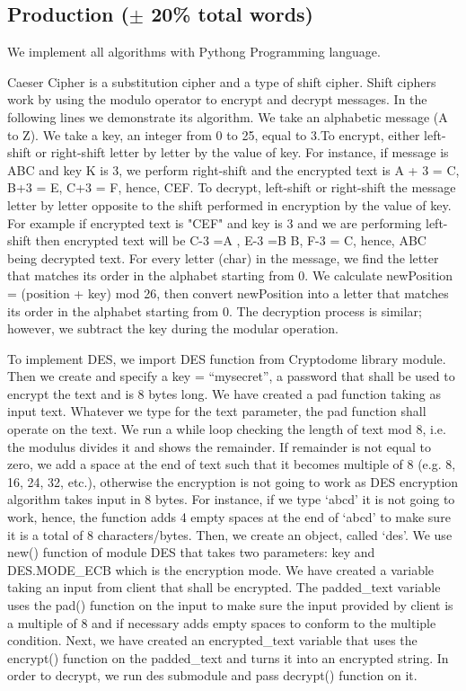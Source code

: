 \subsection{Production ($\pm$ 20\% total words)}

We implement all algorithms with Pythong Programming language. 

Caeser Cipher is a substitution cipher and a type of shift cipher. Shift ciphers work by using the modulo operator to encrypt and decrypt messages. In the following lines we demonstrate its algorithm. We take an alphabetic message (A to Z). We take a key, an integer from 0 to 25, equal to 3.To encrypt, either left-shift or right-shift letter by letter by the value of key. For instance, if message is ABC and key K is 3, we perform right-shift and the encrypted text is A + 3 = C, B+3 = E, C+3 = F, hence, CEF. To decrypt, left-shift or right-shift the message letter by letter opposite to the shift performed in encryption by the value of key. For example if encrypted text is "CEF" and key is 3 and we are performing left-shift then encrypted text will be C-3 =A , E-3 =B B, F-3 = C, hence, ABC being decrypted text. 
For every letter (char) in the message, we find the letter that matches its order in the alphabet starting from 0. We calculate newPosition = (position + key) mod 26, then convert newPosition into a letter that matches its order in the alphabet starting from 0. The decryption process is similar; however, we subtract the key during the modular operation.

To implement DES, we import DES function from Cryptodome library module. Then we create and specify a key = “mysecret”, a password that shall be used to encrypt the text and is 8 bytes long. We have created a pad function taking as input text. Whatever we type for the text parameter, the pad function shall operate on the text. We run a while loop checking the length of text mod 8, i.e. the modulus divides it and shows the remainder. If remainder is not equal to zero, we add a space at the end of text such that it becomes multiple of 8 (e.g. 8, 16, 24, 32, etc.), otherwise the encryption is not going to work as DES encryption algorithm takes input in 8 bytes. For instance, if we type ‘abcd’ it is not going to work, hence, the function adds 4 empty spaces at the end of ‘abcd’ to make sure it is a total of 8 characters/bytes. Then, we create an object, called ‘des’. We use new() function of module DES that takes two parameters: key and DES.MODE_ECB which is the encryption mode. We have created a variable taking an input from client that shall be encrypted. The padded_text variable uses the pad() function on the input to make sure the input provided by client is a multiple of 8 and if necessary adds empty spaces to conform to the multiple condition. Next, we have created an encrypted_text variable that uses the encrypt() function on the padded_text and turns it into an encrypted string. In order to decrypt, we run des submodule and pass decrypt() function on it. 




